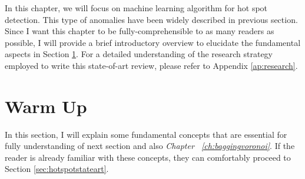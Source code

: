 In this chapter, we will focus on machine learning algorithm for hot spot detection. This type of anomalies have been widely described in previous section. Since I want this chapter to be fully-comprehensible to as many readers as possible, I will provide a brief introductory overview to elucidate the fundamental aspects in Section \ref{sec:introperritardati}. For a detailed understanding of the research strategy employed to write this state-of-art review, please refer to Appendix \ref{ap:research}. 

\section{Warm Up}
\label{sec:introperritardati}
In this section, I will explain some fundamental concepts that are essential for fully understanding of next section and also \emph{Chapter ~\ref{ch:baggingvoronoi}}. If the reader is already familiar with these concepts, they can comfortably proceed to Section \ref{sec:hotspotstateart}. 


